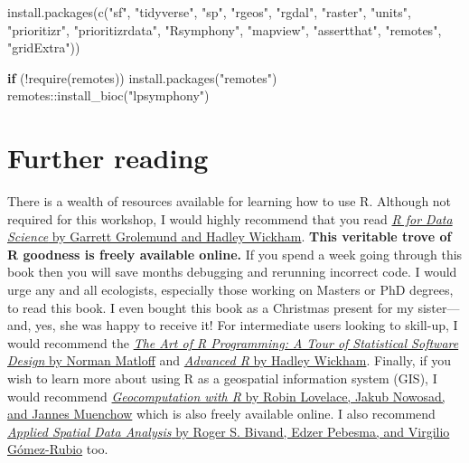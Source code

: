 \documentclass[
  12pt,
]{book}
\newenvironment{Shaded}{\begin{snugshade}}{\end{snugshade}}
\newcommand{\ControlFlowTok}[1]{\textcolor[rgb]{0.13,0.29,0.53}{\textbf{#1}}}
\newcommand{\FunctionTok}[1]{\textcolor[rgb]{0.00,0.00,0.00}{#1}}
\newcommand{\NormalTok}[1]{#1}
\newcommand{\SpecialCharTok}[1]{\textcolor[rgb]{0.00,0.00,0.00}{#1}}
\newcommand{\StringTok}[1]{\textcolor[rgb]{0.31,0.60,0.02}{#1}}
\begin{document}
\begin{Shaded}
\begin{Highlighting}[]
\FunctionTok{install.packages}\NormalTok{(}\FunctionTok{c}\NormalTok{(}\StringTok{"sf"}\NormalTok{, }\StringTok{"tidyverse"}\NormalTok{, }\StringTok{"sp"}\NormalTok{, }\StringTok{"rgeos"}\NormalTok{, }\StringTok{"rgdal"}\NormalTok{, }\StringTok{"raster"}\NormalTok{,}
                   \StringTok{"units"}\NormalTok{, }\StringTok{"prioritizr"}\NormalTok{, }\StringTok{"prioritizrdata"}\NormalTok{, }\StringTok{"Rsymphony"}\NormalTok{,}
                   \StringTok{"mapview"}\NormalTok{, }\StringTok{"assertthat"}\NormalTok{, }\StringTok{"remotes"}\NormalTok{, }\StringTok{"gridExtra"}\NormalTok{))}

\ControlFlowTok{if}\NormalTok{ (}\SpecialCharTok{!}\FunctionTok{require}\NormalTok{(remotes)) }\FunctionTok{install.packages}\NormalTok{(}\StringTok{"remotes"}\NormalTok{)}
\NormalTok{remotes}\SpecialCharTok{::}\FunctionTok{install\_bioc}\NormalTok{(}\StringTok{"lpsymphony"}\NormalTok{)}
\end{Highlighting}
\end{Shaded}

\hypertarget{further-reading}{%
\section{Further reading}\label{further-reading}}

There is a wealth of resources available for learning how to use R. Although not required for this workshop, I would highly recommend that you read \href{https://r4ds.had.co.nz/}{\emph{R for Data Science} by Garrett Grolemund and Hadley Wickham}. \textbf{This veritable trove of R goodness is freely available online.} If you spend a week going through this book then you will save months debugging and rerunning incorrect code. I would urge any and all ecologists, especially those working on Masters or PhD degrees, to read this book. I even bought this book as a Christmas present for my sister---and, yes, she was happy to receive it! For intermediate users looking to skill-up, I would recommend the \href{http://shop.oreilly.com/product/9781593273842.do}{\emph{The Art of R Programming: A Tour of Statistical Software Design} by Norman Matloff} and \href{https://adv-r.hadley.nz/}{\emph{Advanced R} by Hadley Wickham}. Finally, if you wish to learn more about using R as a geospatial information system (GIS), I would recommend \href{https://geocompr.robinlovelace.net/}{\emph{Geocomputation with R} by Robin Lovelace, Jakub Nowosad, and Jannes Muenchow} which is also freely available online. I also recommend \href{https://www.springer.com/gp/book/9781461476177}{\emph{Applied Spatial Data Analysis} by Roger S. Bivand, Edzer Pebesma, and Virgilio Gómez-Rubio} too.
\end{document}
